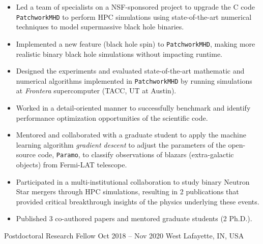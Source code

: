{%
\begin{itemize}
    \item Led a team of specialists on a NSF-sponsored project to upgrade the C code \texttt{PatchworkMHD} to perform HPC simulations using state-of-the-art numerical techniques to model supermassive black hole binaries.
    \item Implemented a new feature (black hole spin) to \texttt{PatchworkMHD}, making more realistic binary black hole simulations without impacting runtime.
    \item Designed the experiments and evaluated state-of-the-art mathematic and numerical algorithms implemented in \texttt{PatchworkMHD} by running simulations at \emph{Frontera} supercomputer (TACC, UT at Austin).
    \item Worked in a detail-oriented manner to successfully benchmark and identify performance optimization opportunities of the scientific code.
    \item Mentored and collaborated with a graduate student to apply the machine learning algorithm \emph{gradient descent} to adjust the parameters of the open-source code, \texttt{Paramo}, to classify observations of blazars (extra-galactic objects) from Fermi-LAT telescope.
    \item Participated in a multi-institutional collaboration to study binary Neutron Star mergers through HPC simulations, resulting in 2 publications that provided critical breakthrough insights of the physics underlying these events.
    \item Published 3 co-authored papers and mentored graduate students (2 Ph.D.).
\end{itemize}
}
\cventry{}%
{\Purdue}%
{Postdoctoral Research Fellow}%
{Oct 2018 -- Nov 2020}%
{West Lafayette, IN, USA}%
